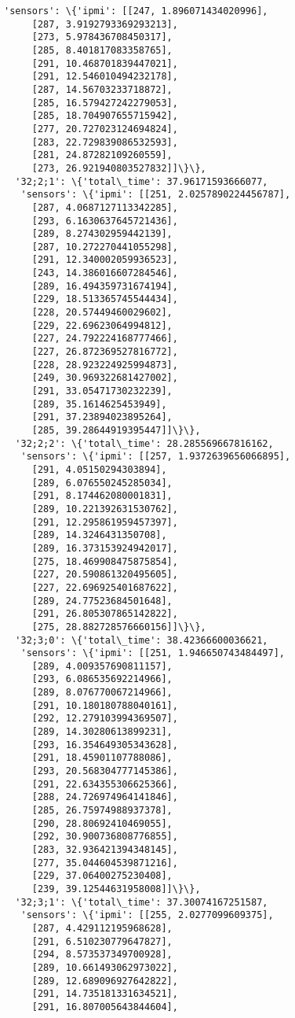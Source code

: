 \documentclass[11pt]{article}
\begin{document}
\begin{tcolorbox}[breakable, size=fbox, boxrule=.5pt, pad at break*=1mm, opacityfill=0]
\begin{Verbatim}[commandchars=\\\{\}]
   'sensors': \{'ipmi': [[247, 1.896071434020996],
     [287, 3.9192793369293213],
     [273, 5.978436708450317],
     [285, 8.401817083358765],
     [291, 10.468701839447021],
     [291, 12.546010494232178],
     [287, 14.56703233718872],
     [285, 16.579427242279053],
     [285, 18.704907655715942],
     [277, 20.727023124694824],
     [283, 22.729839086532593],
     [281, 24.87282109260559],
     [273, 26.921940803527832]]\}\},
  '32;2;1': \{'total\_time': 37.96171593666077,
   'sensors': \{'ipmi': [[251, 2.0257890224456787],
     [287, 4.0687127113342285],
     [293, 6.1630637645721436],
     [289, 8.274302959442139],
     [287, 10.272270441055298],
     [291, 12.340002059936523],
     [243, 14.386016607284546],
     [289, 16.494359731674194],
     [229, 18.513365745544434],
     [228, 20.57449460029602],
     [229, 22.69623064994812],
     [227, 24.792224168777466],
     [227, 26.872369527816772],
     [228, 28.923224925994873],
     [249, 30.969322681427002],
     [291, 33.05471730232239],
     [289, 35.1614625453949],
     [291, 37.23894023895264],
     [285, 39.28644919395447]]\}\},
  '32;2;2': \{'total\_time': 28.285569667816162,
   'sensors': \{'ipmi': [[257, 1.9372639656066895],
     [291, 4.05150294303894],
     [289, 6.076550245285034],
     [291, 8.174462080001831],
     [289, 10.221392631530762],
     [291, 12.295861959457397],
     [289, 14.3246431350708],
     [289, 16.373153924942017],
     [275, 18.469908475875854],
     [227, 20.590861320495605],
     [227, 22.696925401687622],
     [289, 24.77523684501648],
     [291, 26.805307865142822],
     [275, 28.882728576660156]]\}\},
  '32;3;0': \{'total\_time': 38.42366600036621,
   'sensors': \{'ipmi': [[251, 1.946650743484497],
     [289, 4.009357690811157],
     [293, 6.086535692214966],
     [289, 8.076770067214966],
     [291, 10.180180788040161],
     [292, 12.279103994369507],
     [289, 14.30280613899231],
     [293, 16.354649305343628],
     [291, 18.45901107788086],
     [293, 20.568304777145386],
     [291, 22.634355306625366],
     [288, 24.726974964141846],
     [285, 26.75974988937378],
     [290, 28.80692410469055],
     [292, 30.900736808776855],
     [283, 32.936421394348145],
     [277, 35.044604539871216],
     [229, 37.06400275230408],
     [239, 39.12544631958008]]\}\},
  '32;3;1': \{'total\_time': 37.30074167251587,
   'sensors': \{'ipmi': [[255, 2.0277099609375],
     [287, 4.429112195968628],
     [291, 6.510230779647827],
     [294, 8.573537349700928],
     [289, 10.661493062973022],
     [289, 12.689096927642822],
     [291, 14.735181331634521],
     [291, 16.807005643844604],

\end{Verbatim}
\end{tcolorbox}
\end{document}
